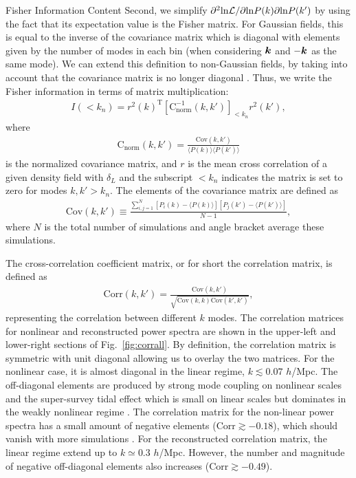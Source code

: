 \begin{section}{Fisher Information Content}
  Second, we simplify
  $\partial ^2 \mathrm{ln \mathcal{L}}/\partial \mathrm{ln} P(k) \partial
  \mathrm{ln} P(k')$
  by using the fact that its expectation value is the Fisher
  matrix.  For Gaussian fields, this is equal to the inverse of the
  covariance matrix which is diagonal with elements given by the
  number of modes in each bin (when considering $\boldsymbol{k}$ and $-\boldsymbol{k}$ as the same mode).  
  We can extend this definition to
  non-Gaussian fields, by taking into account that the covariance
  matrix is no longer diagonal \cite{bib:Rimes2006}.  Thus, we
  write the Fisher information in terms of matrix multiplication:
  \begin{align}
    I \left( < k_n\right) = r^2(k)^{\mathrm{T}} \left[ \mathrm{C^{-1}_{norm}} 
    ( k,k' )\right]_{<k_n} r^2(k') ,
    \label{eq:fisherformulaused}
  \end{align}
  where
  \begin{align}
    \mathrm{C_{norm}} \left( k,k' \right)=\frac{\mathrm{Cov}(k,k')}
    {\langle P(k)\rangle\langle P(k')\rangle}
  \end{align}
  is the normalized covariance matrix, and
  $r$ is the mean cross correlation of a given density field with
  $\delta_L$ and the subscript $<k_n$ indicates the matrix is set to
  zero for modes $k,k'>k_n$.  The elements of the covariance matrix are defined as
  \begin{align}
    \mathrm{Cov}\left(k,k'\right)\equiv \frac{\sum_{i,j=1}^{N}\left[ P_i \left( k \right) - 
    \langle P \left( k \right) \rangle \right]\left[ P_j \left( k' \right) - 
    \langle P \left( k' \right)\rangle \right]}{N-1},
  \end{align}
  where $N$ is the total number of simulations and angle bracket average these simulations.  

  The cross-correlation coefficient matrix, or for short the correlation matrix, 
  is defined as 
  \begin{align}
    \mathrm{Corr}\left(k,k'\right)=\frac{\mathrm{Cov}\left(k,k'\right)}
    {\sqrt{\mathrm{Cov}\left(k,k\right)\mathrm{Cov}\left(k',k'\right)}},
  \end{align}
  representing the correlation between different $k$ modes.  The
  correlation matrices for nonlinear and reconstructed power spectra
  are shown in the upper-left and lower-right sections of Fig.~\ref{fig:corrall}.
  By definition, the correlation matrix is symmetric with unit
  diagonal allowing us to overlay the two matrices.  For the
  nonlinear case, it is almost diagonal in the linear
  regime, $k \lesssim 0.07$ $h$/Mpc.  The off-diagonal
  elements are produced by strong mode coupling on nonlinear scales
  and the super-survey tidal effect which is small on linear scales
  but dominates in the weakly nonlinear regime
  \cite{bib:Kazuyuki2016}.  The correlation matrix for the non-linear
  power spectra has a small amount of negative elements
  ($\mathrm{Corr} \gtrsim -0.18$), which should vanish with more
  simulations \cite{bib:Takahashi2009}.  For the reconstructed
  correlation matrix, the linear regime extend up to $k \simeq 0.3$
  $h$/Mpc.  However, the number and magnitude of negative off-diagonal elements
  also increases ($\mathrm{Corr} \gtrsim -0.49$).


\end{section}
